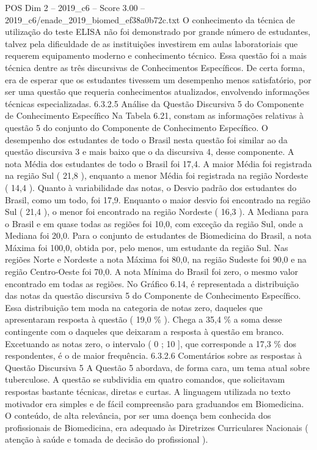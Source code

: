 \begin{textsample}{POS Dim 2 – 2019\_c6 – Score 3.00 – 2019\_c6/enade\_2019\_biomed\_ef38a0b72c.txt}
O conhecimento da técnica de utilização do teste ELISA não foi demonstrado por grande número de estudantes, talvez pela dificuldade de as instituições investirem em aulas laboratoriais que requerem equipamento moderno e conhecimento técnico.
Essa questão foi a mais técnica dentre as três discursivas de Conhecimentos Específicos.
De certa forma, era de esperar que os estudantes tivessem um desempenho menos satisfatório, por ser uma questão que requeria conhecimentos atualizados, envolvendo informações técnicas especializadas. 6.3.2.5 Análise da Questão Discursiva 5 do Componente de Conhecimento Específico Na Tabela 6.21, constam as informações relativas à questão 5 do conjunto do Componente de Conhecimento Específico.
O desempenho dos estudantes de todo o Brasil nesta questão foi similar ao da questão discursiva 3 e mais baixo que o da discursiva 4, desse componente.
A nota Média dos estudantes de todo o Brasil foi 17,4.
A maior Média foi registrada na região Sul ( 21,8 ), enquanto a menor Média foi registrada na região Nordeste ( 14,4 ).
Quanto à variabilidade das notas, o Desvio padrão dos estudantes do Brasil, como um todo, foi 17,9.
Enquanto o maior desvio foi encontrado na região Sul ( 21,4 ), o menor foi encontrado na região Nordeste ( 16,3 ).
A Mediana para o Brasil e em quase todas as regiões foi 10,0, com exceção da região Sul, onde a Mediana foi 20,0.
Para o conjunto de estudantes de Biomedicina do Brasil, a nota Máxima foi 100,0, obtida por, pelo menos, um estudante da região Sul.
Nas regiões Norte e Nordeste a nota Máxima foi 80,0, na região Sudeste foi 90,0 e na região Centro-Oeste foi 70,0.
A nota Mínima do Brasil foi zero, o mesmo valor encontrado em todas as regiões.
No Gráfico 6.14, é representada a distribuição das notas da questão discursiva 5 do Componente de Conhecimento Específico.
Essa distribuição tem moda na categoria de notas zero, daqueles que apresentaram resposta à questão ( 19,0 \% ).
Chega a 35,4 \% a soma desse contingente com o daqueles que deixaram a resposta à questão em branco.
Excetuando as notas zero, o intervalo ( 0 ; 10 ], que corresponde a 17,3 \% dos respondentes, é o de maior frequência. 6.3.2.6 Comentários sobre as respostas à Questão Discursiva 5 A Questão 5 abordava, de forma cara, um tema atual sobre tuberculose.
A questão se subdividia em quatro comandos, que solicitavam respostas bastante técnicas, diretas e curtas.
A linguagem utilizada no texto motivador era simples e de fácil compreensão para graduandos em Biomedicina.
O conteúdo, de alta relevância, por ser uma doença bem conhecida dos profissionais de Biomedicina, era adequado às Diretrizes Curriculares Nacionais ( atenção à saúde e tomada de decisão do profissional ).

\end{textsample}
